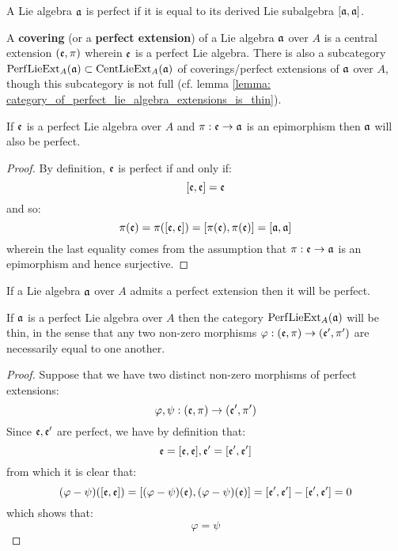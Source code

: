         \begin{definition} \label{def: perfect_lie_algebras} 
            A Lie algebra $\mathfrak{a}$ is perfect if it is equal to its derived Lie subalgebra $[\mathfrak{a}, \mathfrak{a}]$.
        \end{definition}
        \begin{definition} \label{def: lie_algebra_coverings}
            A \textbf{covering} (or a \textbf{perfect extension}) of a Lie algebra $\mathfrak{a}$ over $A$ is a central extension $(\mathfrak{e}, \pi)$ wherein $\mathfrak{e}$ is a perfect Lie algebra. There is also a subcategory $\mathrm{Perf}\mathrm{Lie}\mathrm{Ext}_A(\mathfrak{a}) \subset \mathrm{Cent}\mathrm{Lie}\mathrm{Ext}_A(\mathfrak{a})$ of coverings/perfect extensions of $\mathfrak{a}$ over $A$, though this subcategory is not full (cf. lemma \ref{lemma: category_of_perfect_lie_algebra_extensions_is_thin}).
        \end{definition}
        \begin{lemma}
            If $\mathfrak{e}$ is a perfect Lie algebra over $A$ and $\pi: \mathfrak{e} \to \mathfrak{a}$ is an epimorphism then $\mathfrak{a}$ will also be perfect.  
        \end{lemma}
            \begin{proof}
                By definition, $\mathfrak{e}$ is perfect if and only if:
                    $$[\mathfrak{e}, \mathfrak{e}] = \mathfrak{e}$$
                and so:
                    $$\pi(\mathfrak{e}) = \pi([\mathfrak{e}, \mathfrak{e}]) = [\pi(\mathfrak{e}), \pi(\mathfrak{e})] = [\mathfrak{a}, \mathfrak{a}]$$
                wherein the last equality comes from the assumption that $\pi: \mathfrak{e} \to \mathfrak{a}$ is an epimorphism and hence surjective. 
            \end{proof}
        \begin{corollary} \label{coro: lie_algebras_with_coverings_are_perfect}
            If a Lie algebra $\mathfrak{a}$ over $A$ admits a perfect extension then it will be perfect.
        \end{corollary}
        \begin{lemma} \label{lemma: category_of_perfect_lie_algebra_extensions_is_thin}
            If $\mathfrak{a}$ is a perfect Lie algebra over $A$ then the category $\mathrm{Perf}\mathrm{Lie}\mathrm{Ext}_A(\mathfrak{a})$ will be thin, in the sense that any two non-zero morphisms $\varphi: (\mathfrak{e}, \pi) \to (\mathfrak{e}', \pi')$ are necessarily equal to one another. 
        \end{lemma}
            \begin{proof}
                Suppose that we have two distinct non-zero morphisms of perfect extensions:
                    $$\varphi, \psi: (\mathfrak{e}, \pi) \to (\mathfrak{e}', \pi')$$
                Since $\mathfrak{e}, \mathfrak{e}'$ are perfect, we have by definition that:
                    $$\mathfrak{e} = [\mathfrak{e}, \mathfrak{e}], \mathfrak{e}' = [\mathfrak{e}', \mathfrak{e}']$$
                from which it is clear that:
                    $$(\varphi - \psi)([\mathfrak{e}, \mathfrak{e}]) = [(\varphi - \psi)(\mathfrak{e}), (\varphi - \psi)(\mathfrak{e})] = [\mathfrak{e}', \mathfrak{e}'] - [\mathfrak{e}', \mathfrak{e}'] = 0$$
                which shows that:
                    $$\varphi = \psi$$
            \end{proof}
        
